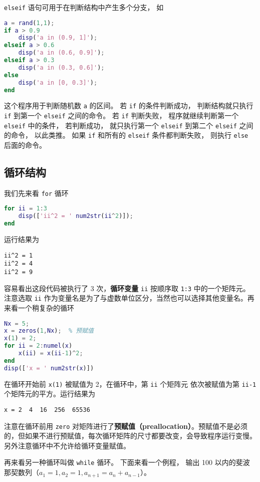 \verb`elseif` 语句可用于在判断结构中产生多个分支， 如

\begin{lstlisting}[language=matlab]
a = rand(1,1);
if a > 0.9
    disp('a in (0.9, 1]');
elseif a > 0.6
    disp('a in (0.6, 0.9]');
elseif a > 0.3
    disp('a in (0.3, 0.6]');
else
    disp('a in [0, 0.3]');
end
\end{lstlisting}

这个程序用于判断随机数 \verb`a` 的区间。 若 \verb`if` 的条件判断成功， 判断结构就只执行 \verb`if` 到第一个 \verb`elseif` 之间的命令。 若 \verb`if` 判断失败， 程序就继续判断第一个 \verb`elseif` 中的条件， 若判断成功， 就只执行第一个 \verb`elseif` 到第二个 \verb`elseif` 之间的命令， 以此类推。 如果 \verb`if` 和所有的 \verb`elseif` 条件都判断失败， 则执行 \verb`else` 后面的命令。

\subsection{循环结构}
我们先来看 \verb`for` 循环

\begin{lstlisting}[language=matlab]
for ii = 1:3
    disp(['ii^2 = ' num2str(ii^2)]);
end
\end{lstlisting}

运行结果为
\begin{lstlisting}[language=matlabC]
ii^2 = 1
ii^2 = 4
ii^2 = 9
\end{lstlisting}
容易看出这段代码被执行了 3 次，\textbf{循环变量} \verb`ii` 按顺序取 \verb`1:3` 中的一个矩阵元。注意选取 \verb`ii` 作为变量名是为了与虚数单位区分，当然也可以选择其他变量名。再来看一个稍复杂的循环

\begin{lstlisting}[language=matlab]
Nx = 5;
x = zeros(1,Nx);  % 预赋值
x(1) = 2;
for ii = 2:numel(x)
    x(ii) = x(ii-1)^2;
end
disp(['x = ' num2str(x)])
\end{lstlisting}

在循环开始前 \verb`x(1)` 被赋值为 2，在循环中，第 \verb`ii` 个矩阵元 依次被赋值为第 \verb`ii-1` 个矩阵元的平方。运行结果为
\begin{lstlisting}[language=matlabC]
x = 2  4  16  256  65536
\end{lstlisting}
注意在循环前用 \verb`zero` 对矩阵进行了\textbf{预赋值（preallocation）}。预赋值不是必须的，但如果不进行预赋值，每次循环矩阵的尺寸都要改变，会导致程序运行变慢。另外注意循环中不允许给循环变量赋值。

再来看另一种循环叫做 \verb`while` 循环。 下面来看一个例程， 输出 100 以内的斐波那契数列（$a_1 = 1, a_2 = 1, a_{n+1} = a_{n} + a_{n-1}$）。

